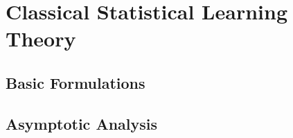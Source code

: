 \documentclass[oneside, openany]{book}
\theoremstyle{definition}
\theoremstyle{remark}
\numberwithin{section}{chapter}
\numberwithin{equation}{chapter}
\begin{document}
	\part{Classical Statistical Learning Theory}\label{part:supervised}
	
	\chapter{Basic Formulations}\label{chap:supervised}
	
	
	\chapter{Asymptotic Analysis}\label{chap:asymp}
	
%	
%	
%	
%	
%	
%	
%	
%	
%	
%
%	
%	
%
%
%	
%	
\end{document}
